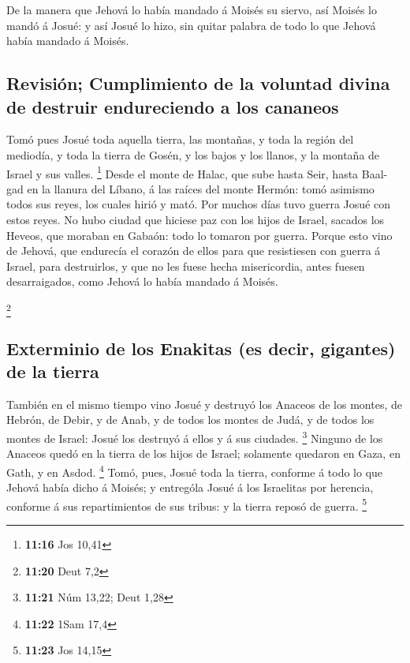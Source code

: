  De la manera que Jehová lo había mandado á Moisés su
siervo, así Moisés lo mandó á Josué: y así Josué lo hizo, sin quitar
palabra de todo lo que Jehová había mandado á Moisés.

\hypertarget{revisiuxf3n-cumplimiento-de-la-voluntad-divina-de-destruir-endureciendo-a-los-cananeos}{%
\subsection{Revisión; Cumplimiento de la voluntad divina de destruir
endureciendo a los
cananeos}\label{revisiuxf3n-cumplimiento-de-la-voluntad-divina-de-destruir-endureciendo-a-los-cananeos}}

 Tomó pues Josué toda aquella tierra, las montañas, y
toda la región del mediodía, y toda la tierra de Gosén, y los bajos y
los llanos, y la montaña de Israel y sus valles. \footnote{\textbf{11:16}
  Jos 10,41}  Desde el monte de Halac, que sube hasta
Seir, hasta Baal-gad en la llanura del Líbano, á las raíces del monte
Hermón: tomó asimismo todos sus reyes, los cuales hirió y mató.
 Por muchos días tuvo guerra Josué con estos reyes.
 No hubo ciudad que hiciese paz con los hijos de Israel,
sacados los Heveos, que moraban en Gabaón: todo lo tomaron por guerra.
 Porque esto vino de Jehová, que endurecía el corazón de
ellos para que resistiesen con guerra á Israel, para destruirlos, y que
no les fuese hecha misericordia, antes fuesen desarraigados, como Jehová
lo había mandado á Moisés.

\footnote{\textbf{11:20} Deut 7,2}

\hypertarget{exterminio-de-los-enakitas-es-decir-gigantes-de-la-tierra}{%
\subsection{Exterminio de los Enakitas (es decir, gigantes) de la
tierra}\label{exterminio-de-los-enakitas-es-decir-gigantes-de-la-tierra}}

 También en el mismo tiempo vino Josué y destruyó los
Anaceos de los montes, de Hebrón, de Debir, y de Anab, y de todos los
montes de Judá, y de todos los montes de Israel: Josué los destruyó á
ellos y á sus ciudades. \footnote{\textbf{11:21} Núm 13,22; Deut 1,28}
 Ninguno de los Anaceos quedó en la tierra de los hijos
de Israel; solamente quedaron en Gaza, en Gath, y en Asdod. \footnote{\textbf{11:22}
  1Sam 17,4}  Tomó, pues, Josué toda la tierra, conforme
á todo lo que Jehová había dicho á Moisés; y entrególa Josué á los
Israelitas por herencia, conforme á sus repartimientos de sus tribus: y
la tierra reposó de guerra. \footnote{\textbf{11:23} Jos 14,15}

